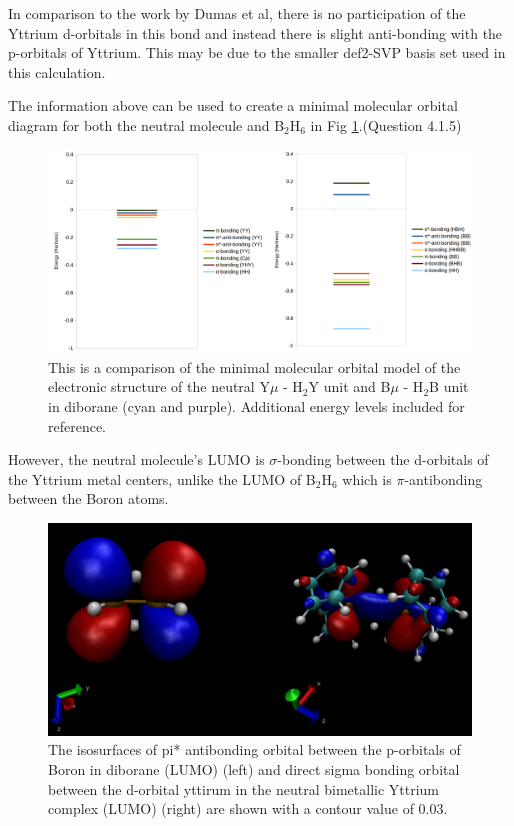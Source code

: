 \documentclass[11pt]{article}
\newcommand*{\comment}[1]{{\color{blue} #1}}
\begin{document}
In comparison to the work by Dumas et al\cite{DUMAS201738}, there is no participation of
the Yttrium d-orbitals in this bond and instead there is slight anti-bonding with the
p-orbitals of Yttrium. This may be due to the smaller def2-SVP basis set used in this
calculation.

The information above can be used to create a minimal molecular orbital diagram
for both the neutral molecule and B$_2$H$_6$ in Fig \ref{fig:minimal}.(Question 4.1.5)

\begin{figure}[H]
  \centering
  \includegraphics[scale=0.2]{minimal_mos.png}
  \caption{This is a comparison of the minimal molecular orbital model
    of the electronic structure of the neutral Y$\mu$ - H$_2$Y unit and B$\mu$ - H$_2$B
    unit in diborane (cyan and purple). Additional energy levels included for reference.}
  \label{fig:minimal}
\end{figure}

However, the neutral molecule's LUMO is $\sigma$-bonding between
the d-orbitals of the Yttrium metal centers, unlike the LUMO of B$_2$H$_6$
which is $\pi$-antibonding between the Boron atoms.

\begin{figure}[H]
  \centering
  \includegraphics[scale=0.2]{lumo.png}
  \caption{The isosurfaces of pi* antibonding orbital between
the p-orbitals of Boron in diborane (LUMO) (left)
    and direct sigma bonding orbital between the d-orbital yttirum in the neutral bimetallic Yttrium
    complex (LUMO) (right) are shown with a contour value of 0.03.}
  \label{fig:lumo}
\end{figure}
\end{document}
